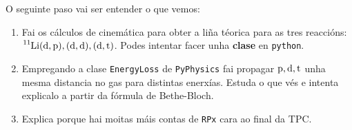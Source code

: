 \documentclass[11pt, a4paper]{article}
\newcommand{\iso}[2]{\ce{^{#1}#2}}
\begin{document}
O seguinte paso vai ser entender o que vemos:
\begin{enumerate}
    \item Fai os cálculos de cinemática para obter a liña téorica para as tres reaccións: $\iso{11}{Li}(\iso{}{d},\iso{}{p}), (\iso{}{d}, \iso{}{d}), (\iso{}{d}, \iso{}{t})$. Podes intentar facer unha \textbf{clase} en \verb|python|.
    \item Empregando a clase \verb|EnergyLoss| de \verb|PyPhysics| fai propagar $\iso{}{p},\iso{}{d},\iso{}{t}$ unha mesma distancia no gas para distintas enerxías. Estuda o que vés e intenta explicalo a partir da fórmula de Bethe-Bloch.
    \item Explica porque hai moitas máis contas de \verb|RPx| cara ao final da TPC.
\end{enumerate}
\end{document}
